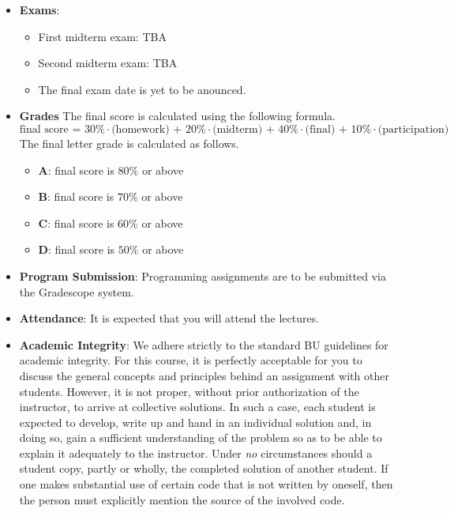 \documentclass[11pt]{article}
\begin{document}
\begin{itemize}
\item {\bf Exams}:
\begin{itemize}
\item
First midterm exam: TBA
\item
Second midterm exam: TBA
\item
The final exam date is yet to be anounced.
\end{itemize}

\item {\bf Grades}
The final score is calculated using the following formula.
\[\mbox{final score = 30\%$\cdot$(homework) + 20\%$\cdot$(midterm) + 40\%$\cdot$(final) + 10\%$\cdot$(participation)}\]
The final letter grade is calculated as follows.
\begin{itemize}
\item{\bf A}: final score is $80\%$ or above
\item{\bf B}: final score is $70\%$ or above
\item{\bf C}: final score is $60\%$ or above
\item{\bf D}: final score is $50\%$ or above
\end{itemize}

\item
{\bf Program Submission}:
Programming assignments are to be submitted via the Gradescope system.

\item
{\bf Attendance}:
It is expected that you will attend the lectures.

\item
{\bf Academic Integrity}:
We adhere strictly to the standard BU guidelines for academic
integrity. For this course, it is perfectly acceptable for you to discuss
the general concepts and principles behind an assignment with other
students. However, it is not proper, without prior authorization of the
instructor, to arrive at collective solutions. In such a case, each student
is expected to develop, write up and hand in an individual solution and, in
doing so, gain a sufficient understanding of the problem so as to be able
to explain it adequately to the instructor.  Under {\em no} circumstances
should a student copy, partly or wholly, the completed solution of another
student. If one makes substantial use of certain code that is not written by
oneself, then the person must explicitly mention the source of the involved
code.

\end{itemize}
\end{document}
